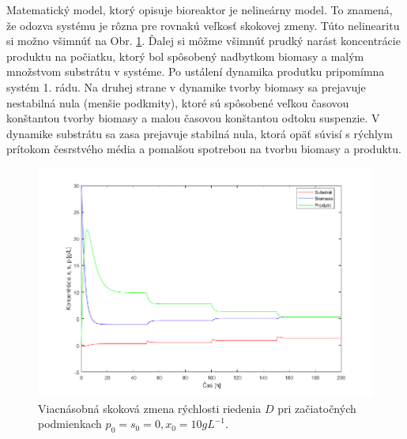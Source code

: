 Matematický model, ktorý opisuje bioreaktor je nelineárny model. To znamená, že odozva systému je rôzna pre rovnakú veľkosť skokovej zmeny.
Túto nelinearitu si možno všimnúť na Obr. \ref{fig:1}.
Ďalej si môžme všimnúť prudký narást koncentrácie produktu na počiatku, ktorý bol spôsobený nadbytkom biomasy a malým množstvom substrátu v systéme.
Po ustálení dynamika produtku pripomímna systém 1. rádu. Na druhej strane v dynamike tvorby biomasy sa prejavuje nestabilná nula (menšie podkmity), ktoré sú spôsobené veľkou časovou konštantou tvorby biomasy a malou časovou konštantou odtoku suspenzie.
V dynamike substrátu sa zasa prejavuje stabilná nula, ktorá opäť súvisí s rýchlym prítokom česrstvého média a pomalšou spotrebou na tvorbu biomasy a produktu.

\begin{figure}
	\centering
	\includegraphics[width=.7\linewidth]{images/step_change}
	\caption[]{Viacnásobná skoková zmena rýchlosti riedenia $D$ pri začiatočných podmienkach $p_0 = s_0 = 0, x_0 = 10 gL^{-1}$.}
	\label{fig:1}
\end{figure}

